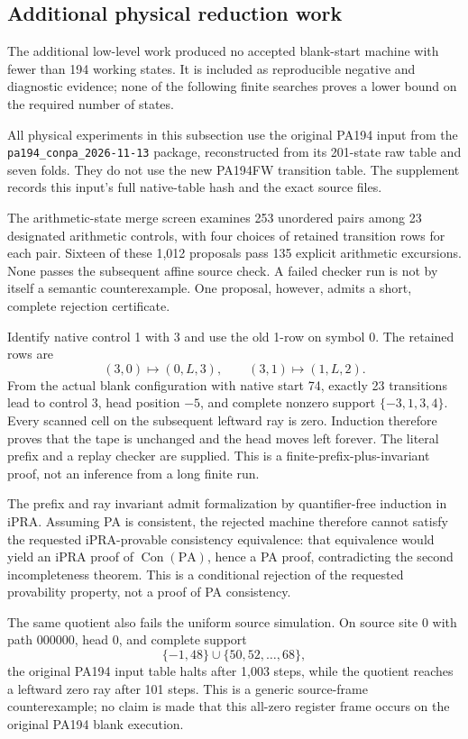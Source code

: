 \subsection{Additional physical reduction work}
The additional low-level work produced no accepted blank-start machine with
fewer than 194 working states. It is included as reproducible negative and
diagnostic evidence; none of the following finite searches proves a lower
bound on the required number of states.

All physical experiments in this subsection use the original PA194 input
from the \nolinkurl{pa194_conpa_2026-11-13} package, reconstructed from its
201-state raw table and seven folds. They do not use the new PA194FW
transition table. The supplement records this input's full native-table
hash and the exact source files.

The arithmetic-state merge screen examines 253 unordered pairs among 23
designated arithmetic controls, with four choices of retained transition
rows for each pair. Sixteen of these 1,012 proposals pass 135 explicit
arithmetic excursions. None passes the subsequent affine source check.
A failed checker run is not by itself a semantic counterexample. One
proposal, however, admits a short, complete rejection certificate.

Identify native control 1 with 3 and use the old 1-row on symbol 0. The
retained rows are
\[
 (3,0)\longmapsto(0,L,3),\qquad
 (3,1)\longmapsto(1,L,2).
\]
From the actual blank configuration with native start 74, exactly 23
transitions lead to control 3, head position $-5$, and complete nonzero
support $\{-3,1,3,4\}$. Every scanned cell on the subsequent leftward
ray is zero. Induction therefore proves that the tape is unchanged and
the head moves left forever. The literal prefix and a replay checker
are supplied. This is a finite-prefix-plus-invariant proof, not an
inference from a long finite run.

The prefix and ray invariant admit formalization by quantifier-free
induction in iPRA. Assuming PA is consistent, the rejected machine
therefore cannot satisfy the requested iPRA-provable consistency
equivalence: that equivalence would yield an iPRA proof of
$\operatorname{Con}(\mathrm{PA})$, hence a PA proof, contradicting
the second incompleteness theorem. This is a conditional rejection
of the requested provability property, not a proof of PA consistency.

The same quotient also fails the uniform source simulation. On source
site 0 with path $000000$, head 0, and complete support
\[
 \{-1,48\}\cup\{50,52,\ldots,68\},
\]
the original PA194 input table halts after 1,003 steps, while the quotient reaches
a leftward zero ray after 101 steps. This is a generic source-frame
counterexample; no claim is made that this all-zero register frame
occurs on the original PA194 blank execution.

